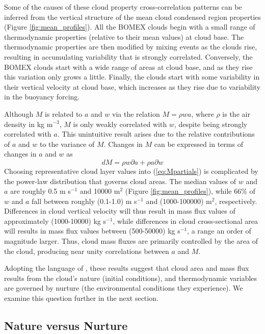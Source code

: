 \documentclass[acp]{copernicus}
\begin{document}
Some of the causes of these cloud property cross-correlation patterns can be 
inferred from the vertical structure of the mean cloud condensed region 
properties (Figure \ref{fig:mean_profiles}).  All the BOMEX clouds begin with 
a small range of thermodynamic properties (relative to their mean values) at 
cloud base. The thermodynamic properties are then modified by mixing events as 
the clouds rise, resulting in accumulating variability that is strongly 
correlated.  Conversely, the BOMEX clouds start with a wide range of areas at 
cloud base, and as they rise this variation only grows a little.  Finally, the 
clouds start with some variability in their vertical velocity at cloud base, 
which increases as they rise due to variability in the buoyancy forcing.

Although $M$ is related to $a$ and $w$ via the relation $M = \rho w a$, where 
$\rho$ is the air density in kg m$^{-3}$, $M$ is only weakly correlated with 
$w$, despite being strongly correlated with $a$.  This unintuitive result 
arises due to the relative contributions of $a$ and $w$ to the variance of $M$.
Changes in $M$ can be expressed in terms of changes in $a$ and $w$ as
\begin{equation}
\label{eq:Mpartials}
d M = \rho w \partial {a} + \rho a \partial {w}
\end{equation}
Choosing representative cloud layer values into (\ref{eq:Mpartials}) is 
complicated by the power-law distribution that governs cloud areas.  The median 
values of $w$ and $a$ are roughly 0.5 m s$^{-1}$ and 10000 m$^2$ (Figure 
\ref{fig:mean_profiles}), while 66\% of $w$ and $a$ fall between roughly 
(0.1-1.0) m s$^{-1}$ and (1000-100000) m$^{2}$, respectively.  Differences in
cloud vertical velocity will thus result in mass flux values of approximately 
(1000-10000) kg s$^{-1}$, while differences in cloud cross-sectional area will 
results in mass flux values between (500-50000) kg s$^{-1}$, a range an order 
of magnitude larger.  Thus, cloud mass fluxes are primarily controlled by the 
area of the cloud, producing near unity correlations between $a$ and $M$.

Adopting the language of \cite{Romps2010a}, these results suggest that cloud 
area and mass flux results from the cloud's nature (initial conditions), and 
thermodynamic variables are governed by nurture (the environmental conditions 
they experience).  We examine this question further in the next section.

\subsection{Nature versus Nurture}
\end{document}
